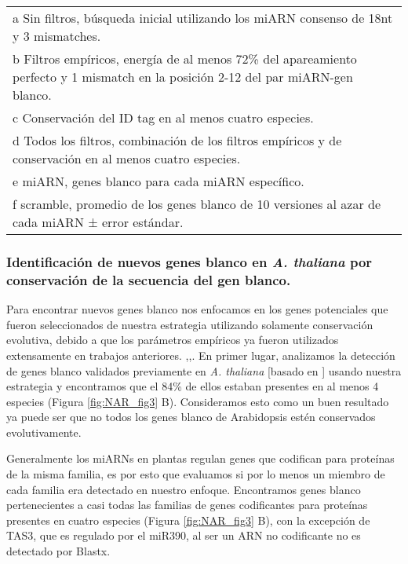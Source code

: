 \begin{landscape}
\begin{table}[]
\begin{tabular}{lllllllllllllllll}
\multicolumn{17}{l}{a Sin filtros, búsqueda inicial utilizando los miARN consenso de 18nt y 3 mismatches.}\\
\multicolumn{17}{l}{b Filtros empíricos, energía de al menos 72\% del apareamiento perfecto y 1 mismatch en la posición 2-12 del par miARN-gen blanco.}\\
\multicolumn{17}{l}{c Conservación del ID tag en al menos cuatro especies.}\\
\multicolumn{17}{l}{d Todos los filtros, combinación de los filtros empíricos y de conservación en al menos cuatro especies.}\\
\multicolumn{17}{l}{e miARN, genes blanco para cada miARN específico.}\\
\multicolumn{17}{l}{f scramble, promedio de los genes blanco de 10 versiones al azar de cada miARN ± error estándar.}\\
\end{tabular}
\end{table}
\end{landscape}

\subsubsection{Identificación de nuevos genes blanco en \textit{A. thaliana} por conservación de la secuencia del gen blanco.}


Para encontrar nuevos genes blanco nos enfocamos en los genes potenciales que fueron seleccionados de nuestra estrategia utilizando solamente conservación evolutiva, debido a que los parámetros empíricos ya fueron utilizados extensamente en trabajos anteriores. \citep{Allen2005207},\citep{JonesRhoades2004787},\citep{Schwab2005517}.
En primer lugar, analizamos la detección de genes blanco validados previamente en \textit{A. thaliana} [basado en \citep{Fahlgren2010}] usando nuestra estrategia y encontramos que el 84\% de ellos estaban presentes en al menos 4 especies (Figura \ref{fig:NAR_fig3} B).
Consideramos esto como un buen resultado ya puede ser que no todos los genes blanco de Arabidopsis estén conservados evolutivamente.

Generalmente los miARNs en plantas regulan genes que codifican para proteínas de la misma familia, es por esto que evaluamos si por lo menos un miembro de cada familia era detectado en nuestro enfoque.
Encontramos genes blanco pertenecientes a casi todas las familias de genes codificantes para proteínas presentes en cuatro especies (Figura \ref{fig:NAR_fig3} B), con la excepción de TAS3, que es regulado por el miR390, al ser un ARN no codificante no es detectado por Blastx. 


